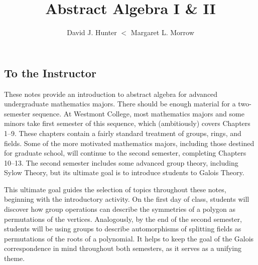 
%

%
\InstructorVersion
%


\large
\frontmatter
\title{Abstract Algebra I \& II}
\author{David J. Hunter $<$ Margaret L. Morrow}
\maketitle
\tableofcontents


\begin{annotation}
 \chapter{To the Instructor}

These notes provide an introduction to abstract algebra for advanced undergraduate mathematics majors. There should be enough material for a two-semester sequence. At Westmont College, most mathematics majors and some minors take first semester of this sequence, which (ambitiously) covers Chapters 1--9. These chapters contain a fairly standard treatment of groups, rings, and fields. Some of the more motivated mathematics majors, including those destined for graduate school, will continue to the second semester, completing Chapters 10--13. The second semester includes some advanced group theory, including Sylow Theory, but its ultimate goal is to introduce students to Galois Theory.

This ultimate goal guides the selection of topics throughout these notes, beginning with the introductory activity. On the first day of class, students will discover how group operations can describe the symmetries of a polygon as permutations of the vertices. Analogously, by the end of the second semester, students will be using groups to describe automorphisms of splitting fields as permutations of the roots of a polynomial. It helps to keep the goal of the Galois correspondence in mind throughout both semesters, as it serves as a unifying theme.


\end{annotation}
